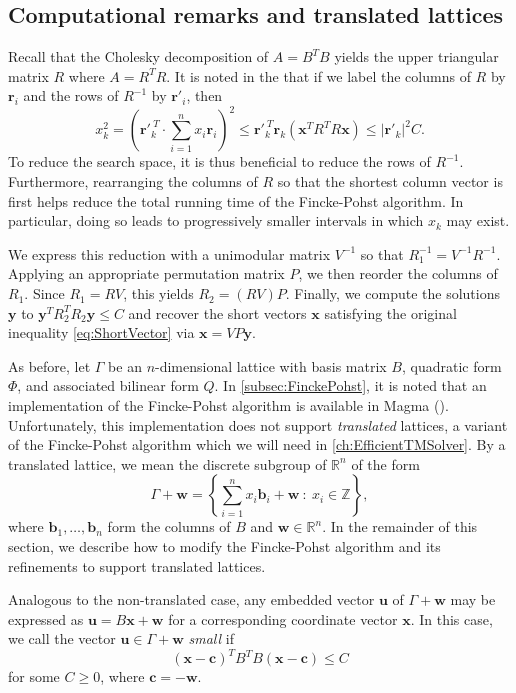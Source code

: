 \subsection{Computational remarks and translated lattices}
\label{subsec:FinckePohstRemarks}

Recall that the Cholesky decomposition of $A = B^TB$ yields the upper triangular matrix $R$ where $A = R^TR$. It is noted in the  that if we label the columns of $R$ by $\mathbf{r}_i$ and the rows of $R^{-1}$ by $\mathbf{r}'_i$, then 
\[x_k^2 = \left( \mathbf{r}'^{\ T}_k \cdot \sum_{i=1}^n x_i \mathbf{r}_i \right)^2 \leq \mathbf{r}'^{\ T}_k \mathbf{r}_k (\mathbf{x}^TR^TR\mathbf{x}) \leq | \mathbf{r}'_k |^2C.\]
To reduce the search space, it is thus beneficial to reduce the rows of $R^{-1}$. Furthermore, rearranging the columns of $R$ so that the shortest column vector is first helps reduce the total running time of the Fincke-Pohst algorithm. In particular, doing so leads to progressively smaller intervals in which $x_k$ may exist. 

We express this reduction with a unimodular matrix $V^{-1}$ so that $R_1^{-1} = V^{-1}R^{-1}$. Applying an appropriate permutation matrix $P$, we then reorder the columns of $R_1$. Since $R_1 = RV$, this yields $R_2 = (RV)P$. Finally, we compute the solutions $\mathbf{y}$ to $\mathbf{y}^TR_2^TR_2\mathbf{y}\leq C$ and recover the short vectors $\mathbf{x}$ satisfying the original inequality \eqref{eq:ShortVector} via $\mathbf{x} = VP\mathbf{y}$. 

As before, let $\Gamma$ be an $n$-dimensional lattice with basis matrix $B$, quadratic form $\Phi$, and associated bilinear form $Q$. In \autoref{subsec:FinckePohst}, it is noted that an implementation of the Fincke-Pohst algorithm is available in Magma (). Unfortunately, this implementation does not support \textit{translated} lattices, a variant of the Fincke-Pohst algorithm which we will need in \autoref{ch:EfficientTMSolver}. By a translated lattice, we mean the discrete subgroup of $\mathbb{R}^n$ of the form
\[\Gamma + \mathbf{w} = \left\{ \sum_{i=1}^n x_i \mathbf{b}_i + \mathbf{w}\ : \ x_i \in \mathbb{Z} \right\},\]
where $\mathbf{b}_1, \dots, \mathbf{b}_n$ form the columns of $B$ and $\mathbf{w} \in \mathbb{R}^n$. In the remainder of this section, we describe how to modify the Fincke-Pohst algorithm and its refinements to support translated lattices. 

Analogous to the non-translated case, any embedded vector $\mathbf{u}$ of $\Gamma + \mathbf{w}$ may be expressed as $\mathbf{u} = B\mathbf{x} + \mathbf{w}$ for a corresponding coordinate vector $\mathbf{x}$. In this case, we call the vector $\mathbf{u} \in \Gamma + \mathbf{w}$ \textit{small} if 
\begin{equation} \label{eq:TransShortVector}
(\mathbf{x}-\mathbf{c})^TB^TB(\mathbf{x}-\mathbf{c}) \leq C
\end{equation}
for some $C \geq 0$, where $\mathbf{c} = -\mathbf{w}$. 

